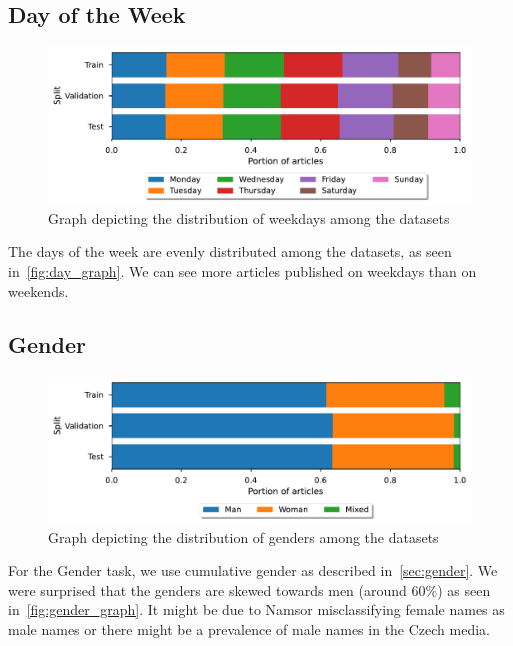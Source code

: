\subsection{Day of the Week}
\begin{figure}[h]
    \centering
    \includegraphics[width=1.0\textwidth]{img/tasks_graph/day_of_week.pdf}
    \caption{Graph depicting the distribution of weekdays among the datasets}
    \label{fig:day_graph}
\end{figure}
The days of the week are evenly distributed among the datasets, as seen in~\autoref{fig:day_graph}.
We can see more articles published on weekdays than on weekends.

\subsection{Gender}
\begin{figure}[h]
    \centering
    \includegraphics[width=1.0\textwidth]{img/tasks_graph/authors_cum_gender.pdf}
    \caption{Graph depicting the distribution of genders among the datasets}
    \label{fig:gender_graph}
\end{figure}
For the Gender task, we use cumulative gender as described in~\autoref{sec:gender}.
We were surprised that the genders are skewed towards men (around $60\%$) as seen in~\autoref{fig:gender_graph}.
It might be due to Namsor misclassifying female names as male names or there might be a prevalence of male names in the Czech media.